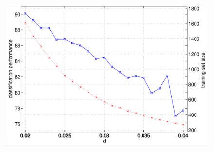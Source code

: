 \documentclass{article}
\begin{document}

\begin{figure}[!ht] \centering
  \begin{tabular}{c}
    \includegraphics[width=1.00\textwidth]{subj8.eps} \\
  \end{tabular}
\end{figure}
\end{document}
